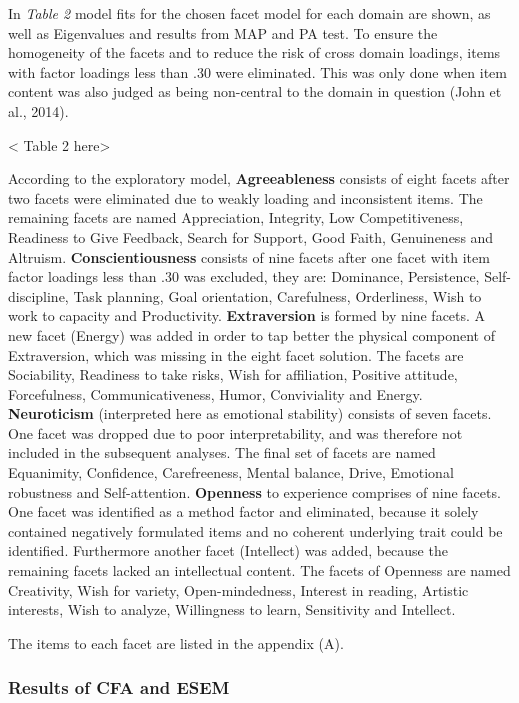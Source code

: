 \documentclass[man]{apa6}
\theoremstyle{definition}
\theoremstyle{definition}
\theoremstyle{definition}
\theoremstyle{remark}
\begin{document}
In \emph{Table 2} model fits for the chosen facet model for each domain
are shown, as well as Eigenvalues and results from MAP and PA test. To
ensure the homogeneity of the facets and to reduce the risk of cross
domain loadings, items with factor loadings less than .30 were
eliminated. This was only done when item content was also judged as
being non-central to the domain in question (John et al., 2014).

\textless{} Table 2 here\textgreater{}

According to the exploratory model, \textbf{Agreeableness} consists of
eight facets after two facets were eliminated due to weakly loading and
inconsistent items. The remaining facets are named Appreciation,
Integrity, Low Competitiveness, Readiness to Give Feedback, Search for
Support, Good Faith, Genuineness and Altruism.
\textbf{Conscientiousness} consists of nine facets after one facet with
item factor loadings less than .30 was excluded, they are: Dominance,
Persistence, Self-discipline, Task planning, Goal orientation,
Carefulness, Orderliness, Wish to work to capacity and Productivity.
\textbf{Extraversion} is formed by nine facets. A new facet (Energy) was
added in order to tap better the physical component of Extraversion,
which was missing in the eight facet solution. The facets are
Sociability, Readiness to take risks, Wish for affiliation, Positive
attitude, Forcefulness, Communicativeness, Humor, Conviviality and
Energy. \textbf{Neuroticism} (interpreted here as emotional stability)
consists of seven facets. One facet was dropped due to poor
interpretability, and was therefore not included in the subsequent
analyses. The final set of facets are named Equanimity, Confidence,
Carefreeness, Mental balance, Drive, Emotional robustness and
Self-attention. \textbf{Openness} to experience comprises of nine
facets. One facet was identified as a method factor and eliminated,
because it solely contained negatively formulated items and no coherent
underlying trait could be identified. Furthermore another facet
(Intellect) was added, because the remaining facets lacked an
intellectual content. The facets of Openness are named Creativity, Wish
for variety, Open-mindedness, Interest in reading, Artistic interests,
Wish to analyze, Willingness to learn, Sensitivity and Intellect.

The items to each facet are listed in the appendix (A).

\hypertarget{results-of-cfa-and-esem}{%
\subsubsection{Results of CFA and ESEM}\label{results-of-cfa-and-esem}}
\end{document}
